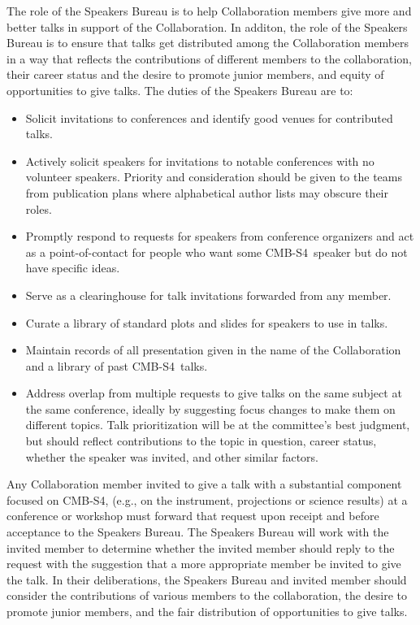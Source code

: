 \documentclass[12pt]{article}
\newcommand\collabname{CMB-S4}
\begin{document}
The role of the Speakers Bureau is to help Collaboration members give more and better talks in support of the Collaboration. In additon, the role of the Speakers Bureau is to ensure that talks get distributed among the Collaboration members in a way that reflects the contributions of different members to the collaboration, their career status and the desire to promote junior members, and equity of opportunities to give talks. The duties of the Speakers Bureau are to:
\begin{itemize}

\item Solicit invitations to conferences and identify good venues for contributed talks.

\item Actively solicit speakers for invitations to notable conferences with no volunteer speakers. Priority and consideration should be given to the teams from publication plans where alphabetical author lists may obscure their roles. 

\item Promptly respond to requests for speakers from conference organizers and act as a point-of-contact for people who want some \collabname\ speaker but do not have specific ideas.

\item Serve as a clearinghouse for talk invitations forwarded from any member.

\item Curate a library of standard plots and slides for speakers to use in talks.

\item Maintain records of all presentation given in the name of the Collaboration and a library of past \collabname\  talks.

\item Address overlap from multiple requests to give talks on the same subject at the same conference, ideally by suggesting focus changes to make them on different topics. Talk prioritization will be at the committee's best judgment, but should reflect contributions to the topic in question, career status, whether the speaker was invited, and other similar factors.

\end{itemize}

Any Collaboration member invited to give a talk with a substantial component focused on \collabname, (e.g., on the instrument, projections or science results) at a conference or workshop must forward that request upon receipt and before acceptance to the Speakers Bureau.  The Speakers Bureau will work with the invited member to determine whether the invited member should reply to the request with the suggestion that a more appropriate member be invited to give the talk. In their deliberations, the Speakers Bureau and invited member should consider the contributions of various members to the collaboration, the desire to promote junior members, and the fair distribution of opportunities to give talks.
\end{document}
